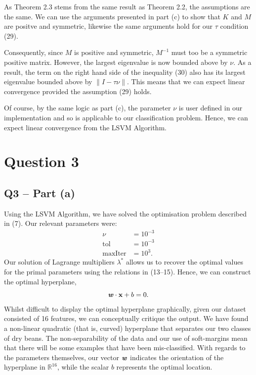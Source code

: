 \documentclass{article}
\begin{document}
As Theorem 2.3 stems from the same result as Theorem 2.2, the assumptions are the same. We can use the arguments presented in part (c) to show that $K$ and $M$ are positve and symmetric, likewise the same arguments hold for our $\tau$ condition (29). \par

Consequently, since $M$ is positive and symmetric, $M^{-1}$ must too be a symmetric positive matrix. However, the largest eigenvalue is now bounded above by $\nu$. As a result, the term on the right hand side of the inequality (30) also has its largest eigenvalue bounded above by $\| I -\tau \nu\|$. This means that we can expect linear convergence provided the assumption (29) holds. \par

Of course, by the same logic as part (c), the parameter $\nu$ is user defined in our implementation and so is applicable to our classification problem. Hence, we can expect linear convergence from the LSVM Algorithm. 


\newpage
\section{Question 3}

\subsection*{Q3 – Part (a)}
Using the LSVM Algorithm, we have solved the optimisation problem described in (7). Our relevant parameters were:
\begin{align}
    \nu &= 10^{-3} \\
    \text{tol} &= 10^{-3} \\
    \text{maxIter} &= 10^{3}.
\end{align}
Our solution of Lagrange multipliers $\lambda^{*}$ allows us to recover the optimal values for the primal parameters using the relations in (13–15). Hence, we can construct the optimal hyperplane,
\begin{equation}
    \textbf{\textit{w}} \cdot \textbf{x} + b = 0.
\end{equation}
Whilst difficult to display the optimal hyperplane graphically, given our dataset consisted of 16 features, we can conceptually critique the output. We have found a non-linear quadratic (that is, curved) hyperplane that separates our two classes of dry beans. The non-separability of the data and our use of soft-margins mean that there will be some examples that have been mis-classified. With regards to the parameters themselves, our vector $\textbf{\textit{w}}$ indicates the orientation of the hyperplane in $\mathbb{R}^{16}$, while the scalar $b$ represents the optimal location. \par
\end{document}
